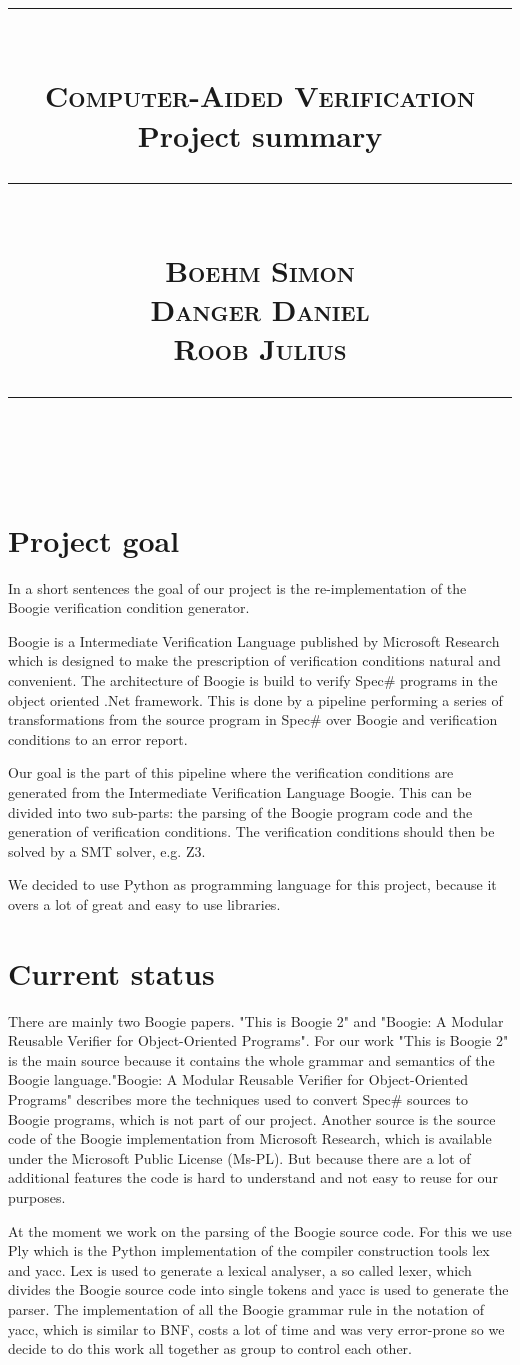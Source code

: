 \documentclass[paper=a4, fontsize=12pt]{scrartcl}
\title{	
  \rule{\linewidth}{1px} \\[0.4cm]
  \textsc{Computer-Aided Verification} \\ [25pt]
  \huge Project summary \\
  \rule{\linewidth}{1px} \\[0.4cm]
  \textsc{Boehm Simon} \\ [12pt]
  \textsc{Danger Daniel} \\ [12pt]
  \textsc{Roob Julius} \\ [12pt]
  \rule{\linewidth}{1px} \\[0.4cm]
}
\begin{document}
\maketitle 

\section{Project goal}
In a short sentences the goal of our project is the re-implementation of the Boogie verification condition generator. 

Boogie is a Intermediate Verification Language published by Microsoft Research which is designed to make the prescription of verification conditions natural and convenient. The architecture of Boogie is build to verify Spec\# programs in the object oriented .Net framework. This is done by a pipeline performing a series of transformations from the source program in Spec\# over Boogie and verification conditions to an error report.

Our goal is the part of this pipeline where the verification conditions are generated from the Intermediate Verification Language Boogie. This can be divided into two sub-parts: the parsing of the Boogie program code and the generation of verification conditions. The verification conditions should then be solved by a SMT solver, e.g. Z3.

We decided to use Python as programming language for this project, because it overs a lot of great and easy to use libraries. 

\section{Current status}
There are mainly two Boogie papers. "This is Boogie 2" and "Boogie: A Modular Reusable Verifier for Object-Oriented Programs". For our work "This is Boogie 2" is the main source because it contains the whole grammar and semantics of the Boogie language."Boogie: A Modular Reusable Verifier for Object-Oriented Programs" describes more the techniques used to convert Spec\# sources to Boogie programs, which is not part of our project. Another source is the source code of the Boogie implementation from Microsoft Research, which is available under the Microsoft Public License (Ms-PL). But because there are a lot of additional features the code is hard to understand and not easy to reuse for our purposes.

At the moment we work on the parsing of the Boogie source code. For this we use Ply which is the Python implementation of the compiler construction tools lex and yacc. Lex is used to generate a lexical analyser, a so called lexer, which divides the Boogie source code into single tokens and yacc is used to generate the parser. The implementation of all the Boogie grammar rule in the notation of yacc, which is similar to BNF, costs a lot of time and was very error-prone so we decide to do this work all together as group to control each other.
\end{document}
